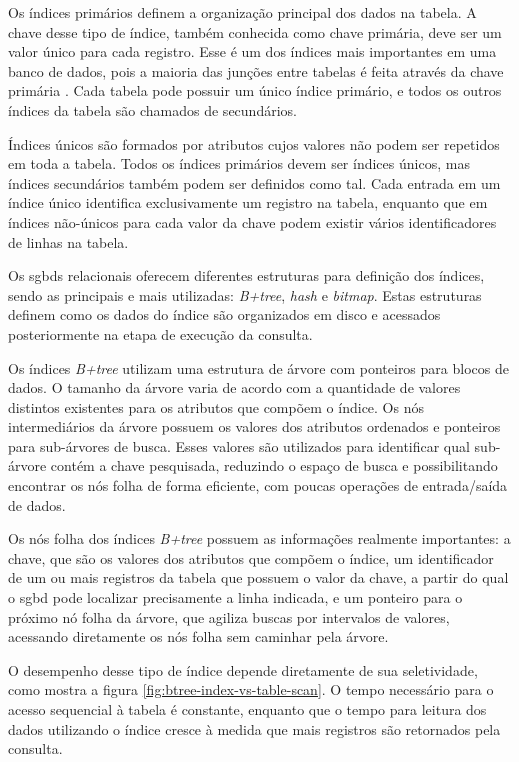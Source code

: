 Os índices primários definem a organização principal dos dados na tabela. A chave desse tipo de índice, também conhecida como chave primária, deve ser um valor único para cada registro. Esse é um dos índices mais importantes em uma banco de dados, pois a maioria das junções entre tabelas é feita através da chave primária \cite[p. 56--57]{Lightstone:2007}. Cada tabela pode possuir um único índice primário, e todos os outros índices da tabela são chamados de secundários.

Índices únicos são formados por atributos cujos valores não podem ser repetidos em toda a tabela. Todos os índices primários devem ser índices únicos, mas índices secundários também podem ser definidos como tal. Cada entrada em um índice único identifica exclusivamente um registro na tabela, enquanto que em índices não-únicos para cada valor da chave podem existir vários identificadores de linhas na tabela.

Os \glspl{sgbd} relacionais oferecem diferentes estruturas para definição dos índices, sendo as principais e mais utilizadas: \emph{B+tree}, \emph{hash} e \emph{bitmap}. Estas estruturas definem como os dados do índice são organizados em disco e acessados posteriormente na etapa de execução da consulta.

Os índices \emph{B+tree} utilizam uma estrutura de árvore com ponteiros para blocos de dados. O tamanho da árvore varia de acordo com a quantidade de valores distintos existentes para os atributos que compõem o índice. Os nós intermediários da árvore possuem os valores dos atributos ordenados e ponteiros para sub-árvores de busca. Esses valores são utilizados para identificar qual sub-árvore contém a chave pesquisada, reduzindo o espaço de busca e possibilitando encontrar os nós folha de forma eficiente, com poucas operações de entrada/saída de dados.

Os nós folha dos índices \emph{B+tree} possuem as informações realmente importantes: a chave, que são os valores dos atributos que compõem o índice, um identificador de um ou mais registros da tabela que possuem o valor da chave, a partir do qual o \gls{sgbd} pode localizar precisamente a linha indicada, e um ponteiro para o próximo nó folha da árvore, que agiliza buscas por intervalos de valores, acessando diretamente os nós folha sem caminhar pela árvore.

O desempenho desse tipo de índice depende diretamente de sua seletividade, como mostra a figura \ref{fig:btree-index-vs-table-scan}. O tempo necessário para o acesso sequencial à tabela é constante, enquanto que o tempo para leitura dos dados utilizando o índice cresce à medida que mais registros são retornados pela consulta.

